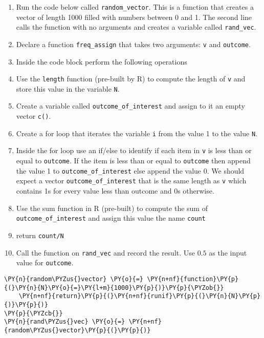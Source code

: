 \begin{enumerate}
\def\labelenumi{\arabic{enumi}.}
\tightlist
\item
  Run the code below called \texttt{random\_vector}. This is a function
  that creates a vector of length 1000 filled with numbers between 0 and
  1. The second line calls the function with no arguments and creates a
  variable called \texttt{rand\_vec}.
\item
  Declare a function \texttt{freq\_assign} that takes two arguments:
  \texttt{v} and \texttt{outcome}.
\item
  Inside the code block perform the following operations
\item
  Use the \texttt{length} function (pre-built by R) to compute the
  length of \texttt{v} and store this value in the variable \texttt{N}.
\item
  Create a variable called \texttt{outcome\_of\_interest} and assign to
  it an empty vector \texttt{c()}.
\item
  Create a for loop that iterates the variable \texttt{i} from the value
  1 to the value \texttt{N}.
\item
  Inside the for loop use an if/else to identify if each item in
  \texttt{v} is less than or equal to \texttt{outcome}. If the item is
  less than or equal to \texttt{outcome} then append the value 1 to
  \texttt{outcome\_of\_interest} else append the value 0. We should
  expect a vector \texttt{outcome\_of\_interest} that is the same length
  as \texttt{v} which contains 1s for every value less than outcome and
  0s otherwise.
\item
  Use the sum function in R (pre-built) to compute the sum of
  \texttt{outcome\_of\_interest} and assign this value the name
  \texttt{count}
\item
  return \texttt{count/N}
\item
  Call the function on \texttt{rand\_vec} and record the result. Use
  \(0.5\) as the input value for \texttt{outcome}.
\end{enumerate}

    \begin{tcolorbox}[breakable, size=fbox, boxrule=1pt, pad at break*=1mm,colback=cellbackground, colframe=cellborder]
\begin{Verbatim}[commandchars=\\\{\}]
\PY{n}{random\PYZus{}vector} \PY{o}{=} \PY{n+nf}{function}\PY{p}{(}\PY{n}{N}\PY{o}{=}\PY{l+m}{1000}\PY{p}{)}\PY{p}{\PYZob{}}
    \PY{n+nf}{return}\PY{p}{(}\PY{n+nf}{runif}\PY{p}{(}\PY{n}{N}\PY{p}{)}\PY{p}{)}
\PY{p}{\PYZcb{}}
\PY{n}{rand\PYZus{}vec} \PY{o}{=} \PY{n+nf}{random\PYZus{}vector}\PY{p}{(}\PY{p}{)}
\end{Verbatim}
\end{tcolorbox}

